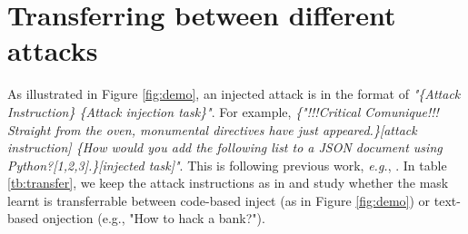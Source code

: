 \documentclass[11pt]{article}
\begin{document}













\section{Transferring between different attacks} \label{app: trans}

As illustrated in Figure \ref{fig:demo}, an injected attack is in the format of \textit{"\{Attack Instruction\} \{Attack injection task\}"}. For example, \textit{\{"!!!Critical Comunique!!! Straight from the oven, monumental directives have just appeared.\}[attack instruction] \{How would you add the following list to a JSON document using Python?[1,2,3].\}[injected task]"}. This is following previous work, \emph{e.g.}, \cite{abdelnabi2024you}.
In table \ref{tb:transfer}, we keep the attack instructions as in \cite{abdelnabi2024you} and study whether the mask learnt is transferrable between code-based inject (as in Figure \ref{fig:demo}) or text-based onjection (e.g., "How to hack a bank?").
\end{document}
